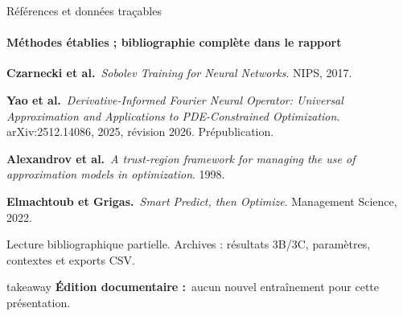\documentclass[aspectratio=169,11pt]{beamer}
\newcommand{\takeaway}[2]{%
  \begin{beamercolorbox}[wd=\linewidth,sep=7pt]{takeaway}
  \small\textbf{#1}\ #2
  \end{beamercolorbox}}
\begin{document}
\begin{frame}[t]{Références et données traçables}
\framesubtitle{Méthodes établies ; bibliographie complète dans le rapport}
\small
\textbf{Czarnecki et al.}\ \emph{Sobolev Training for Neural Networks}.
NIPS, 2017.\par\vspace{0.22cm}
\textbf{Yao et al.}\ \emph{Derivative-Informed Fourier Neural Operator:
Universal Approximation and Applications to PDE-Constrained Optimization}.
arXiv:2512.14086, 2025, révision 2026. Prépublication.\par\vspace{0.22cm}
\textbf{Alexandrov et al.}\ \emph{A trust-region framework for managing
the use of approximation models in optimization}. 1998.\par\vspace{0.22cm}
\textbf{Elmachtoub et Grigas.}\ \emph{Smart Predict, then Optimize}.
Management Science, 2022.\par\vspace{0.3cm}
Lecture bibliographique partielle. Archives : résultats 3B/3C, paramètres,
contextes et exports CSV.
\vfill
\takeaway{Édition documentaire :}{aucun nouvel entraînement pour cette présentation.}
\end{frame}
\end{document}
